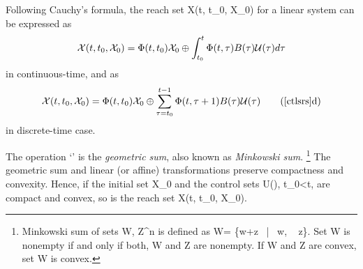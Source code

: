 \documentclass[letterpaper,10pt,english]{sphinxmanual}
\begin{document}
Following Cauchy’s formula, the reach set
{\mathcal X}(t, t_0, {\mathcal X}_0) for a linear system can be
expressed as
\begin{gather}
\begin{split}{\mathcal X}(t, t_0, {\mathcal X}_0) =
\Phi(t, t_0){\mathcal X}_0 \oplus \int_{t_0}^t\Phi(t, \tau)B(\tau){\mathcal U}(\tau)d\tau
\label{ctlsrs}\end{split}\notag
\end{gather}
in continuous-time, and as
\begin{gather}
\begin{split}{\mathcal X}(t, t_0, {\mathcal X}_0) =
\Phi(t, t_0){\mathcal X}_0 \oplus \sum_{\tau=t_0}^{t-1}\Phi(t, \tau+1)B(\tau){\mathcal U}(\tau)
\tag*{(\ref{ctlsrs}d)}
\label{dtlsrs}\end{split}\notag
\end{gather}
in discrete-time case.

The operation ‘\oplus’ is the \emph{geometric sum}, also known as
\emph{Minkowski sum}. \footnote{
Minkowski sum of sets
{\mathcal W}, {\mathcal Z}^n is defined as
{\mathcal W}= \{w+z ~|~ w, ~ z\}.
Set {\mathcal W} is nonempty if and only if
both, {\mathcal W} and {\mathcal Z} are nonempty. If
{\mathcal W} and {\mathcal Z} are convex, set
{\mathcal W} is convex.
} The geometric sum and linear (or affine)
transformations preserve compactness and convexity. Hence, if the
initial set {\mathcal X}_0 and the control sets
{\mathcal U}(\tau), t_0\leqslant\tau<t, are compact and
convex, so is the reach set
{\mathcal X}(t, t_0, {\mathcal X}_0).
\end{document}
